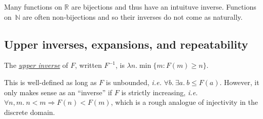 Many functions on $\mathbb{R}$ are bijections and thus have an intuituve inverse.
Functions on~$\mathbb{N}$ are often non-bijections and so their inverses
do not come as naturally.

\subsection{Upper inverses, expansions, and repeatability}
\begin{defn} \label{defn: inverse}
The \href{https://github.com/inv-ack/inv-ack/blob/7270e64a2600b771f2b1b1b151f7d13fb2ae6c97/inverse.v#L28-L45}{
\emph{upper inverse}} of $F$, written $F^{-1}$,
is $\lambda n. \min\{m : F(m)\ge n\}$.\end{defn}
This is well-defined as long as $F$ is unbounded,
\emph{i.e.} $\forall b.~\exists a.~ b \leq F(a)$.
However, it only makes sense as an ``inverse'' if $F$ is strictly
increasing, \emph{i.e.} $\forall n,m.~n < m \Rightarrow F(n) < F(m)$, which is
a rough analogue of injectivity in the discrete domain.

